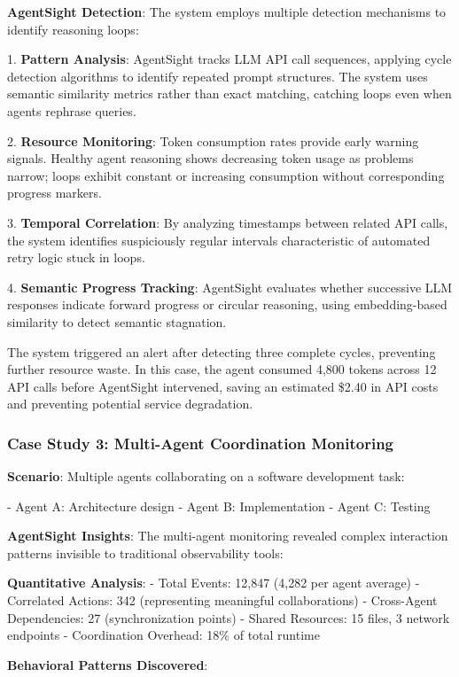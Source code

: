 \textbf{AgentSight Detection}: The system employs multiple detection mechanisms to identify reasoning loops:

1. \textbf{Pattern Analysis}: AgentSight tracks LLM API call sequences, applying cycle detection algorithms to identify repeated prompt structures. The system uses semantic similarity metrics rather than exact matching, catching loops even when agents rephrase queries.

2. \textbf{Resource Monitoring}: Token consumption rates provide early warning signals. Healthy agent reasoning shows decreasing token usage as problems narrow; loops exhibit constant or increasing consumption without corresponding progress markers.

3. \textbf{Temporal Correlation}: By analyzing timestamps between related API calls, the system identifies suspiciously regular intervals characteristic of automated retry logic stuck in loops.

4. \textbf{Semantic Progress Tracking}: AgentSight evaluates whether successive LLM responses indicate forward progress or circular reasoning, using embedding-based similarity to detect semantic stagnation.

The system triggered an alert after detecting three complete cycles, preventing further resource waste. In this case, the agent consumed 4,800 tokens across 12 API calls before AgentSight intervened, saving an estimated \$2.40 in API costs and preventing potential service degradation.

\subsubsection{Case Study 3: Multi-Agent Coordination Monitoring}

\textbf{Scenario}: Multiple agents collaborating on a software development task:

- Agent A: Architecture design
- Agent B: Implementation
- Agent C: Testing

\textbf{AgentSight Insights}: The multi-agent monitoring revealed complex interaction patterns invisible to traditional observability tools:

\textbf{Quantitative Analysis}:
- Total Events: 12,847 (4,282 per agent average)
- Correlated Actions: 342 (representing meaningful collaborations)
- Cross-Agent Dependencies: 27 (synchronization points)
- Shared Resources: 15 files, 3 network endpoints
- Coordination Overhead: 18\% of total runtime

\textbf{Behavioral Patterns Discovered}:

